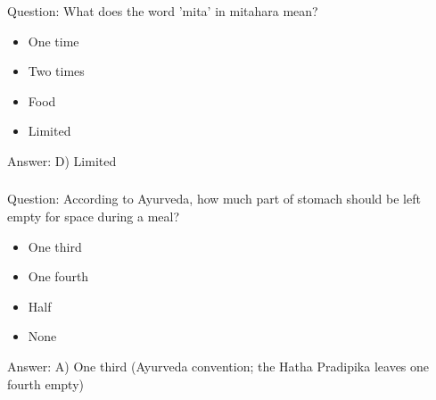 %
%
%

\begin{frame}[fragile]\frametitle{}

Question: What does the word 'mita' in mitahara mean?

\begin{itemize}
\item[A)] One time
\item[B)] Two times
\item[C)] Food
\item[D)] Limited
\end{itemize}

Answer: D) Limited
\end{frame}

\begin{frame}[fragile]\frametitle{}

Question: According to Ayurveda, how much part of stomach should be left empty for space during a meal?

\begin{itemize}
\item[A)] One third
\item[B)] One fourth
\item[C)] Half
\item[D)] None
\end{itemize}

Answer: A) One third (Ayurveda convention; the Hatha Pradipika leaves one fourth empty)
\end{frame}

